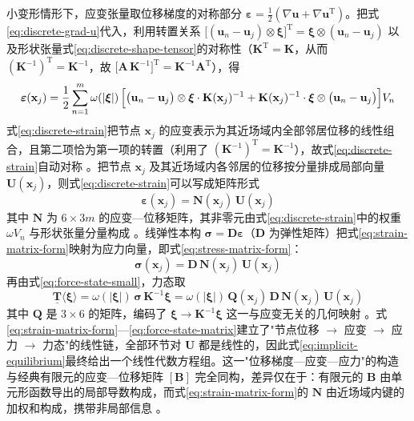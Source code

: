 小变形情形下，应变张量取位移梯度的对称部分 $\boldsymbol{\varepsilon}=\tfrac{1}{2}(\nabla\mathbf{u}+\nabla\mathbf{u}^{\mathrm{T}})$。把式\eqref{eq:discrete-grad-u}代入，利用转置关系 $\bigl[(\mathbf{u}_n-\mathbf{u}_j)\otimes\boldsymbol{\xi}\bigr]^{\mathrm{T}}=\boldsymbol{\xi}\otimes(\mathbf{u}_n-\mathbf{u}_j)$ 以及形状张量式\eqref{eq:discrete-shape-tensor}的对称性（$\mathbf{K}^{\mathrm{T}}=\mathbf{K}$，从而 $(\mathbf{K}^{-1})^{\mathrm{T}}=\mathbf{K}^{-1}$，故 $\bigl[\mathbf{A}\,\mathbf{K}^{-1}\bigr]^{\mathrm{T}}=\mathbf{K}^{-1}\mathbf{A}^{\mathrm{T}}$），得
\begin{equation}
  \boldsymbol{\varepsilon}(\mathbf{x}_j)=\frac{1}{2}\sum_{n=1}^{m}\omega(|\boldsymbol{\xi}|)\,
  \Bigl[\bigl(\mathbf{u}_n-\mathbf{u}_j\bigr)\otimes\boldsymbol{\xi}\cdot\mathbf{K}(\mathbf{x}_j)^{-1}
  +\mathbf{K}(\mathbf{x}_j)^{-1}\cdot\boldsymbol{\xi}\otimes\bigl(\mathbf{u}_n-\mathbf{u}_j\bigr)\Bigr]V_n
  \label{eq:discrete-strain}
\end{equation}
式\eqref{eq:discrete-strain}把节点 $\mathbf{x}_j$ 的应变表示为其近场域内全部邻居位移的线性组合，且第二项恰为第一项的转置（利用了 $(\mathbf{K}^{-1})^{\mathrm{T}}=\mathbf{K}^{-1}$），故式\eqref{eq:discrete-strain}自动对称 \cite{Breitenfeld2014,BreitenfeldThesis2014}。把节点 $\mathbf{x}_j$ 及其近场域内各邻居的位移按分量排成局部向量 $\mathbf{U}(\mathbf{x}_j)$，则式\eqref{eq:discrete-strain}可以写成矩阵形式
\begin{equation}
  \boldsymbol{\varepsilon}(\mathbf{x}_j)=\mathbf{N}(\mathbf{x}_j)\,\mathbf{U}(\mathbf{x}_j)
  \label{eq:strain-matrix-form}
\end{equation}
其中 $\mathbf{N}$ 为 $6\times 3m$ 的应变—位移矩阵，其非零元由式\eqref{eq:discrete-strain}中的权重 $\omega V_n$ 与形状张量分量构成 \cite{BreitenfeldThesis2014}。线弹性本构 $\boldsymbol{\sigma}=\mathbf{D}\boldsymbol{\varepsilon}$（$\mathbf{D}$ 为弹性矩阵）把式\eqref{eq:strain-matrix-form}映射为应力向量，即式\eqref{eq:stress-matrix-form}：
\begin{equation}
  \boldsymbol{\sigma}(\mathbf{x}_j)=\mathbf{D}\,\mathbf{N}(\mathbf{x}_j)\,\mathbf{U}(\mathbf{x}_j)
  \label{eq:stress-matrix-form}
\end{equation}
再由式\eqref{eq:force-state-small}，力态取
\begin{equation}
  \underline{\mathbf{T}}\langle\boldsymbol{\xi}\rangle
  =\omega(|\boldsymbol{\xi}|)\,\boldsymbol{\sigma}\,\mathbf{K}^{-1}\boldsymbol{\xi}
  =\omega(|\boldsymbol{\xi}|)\,\mathbf{Q}(\mathbf{x}_j)\,\mathbf{D}\,\mathbf{N}(\mathbf{x}_j)\,\mathbf{U}(\mathbf{x}_j)
  \label{eq:force-state-matrix}
\end{equation}
其中 $\mathbf{Q}$ 是 $3\times 6$ 的矩阵，编码了 $\boldsymbol{\xi}\to\mathbf{K}^{-1}\boldsymbol{\xi}$ 这一与应变无关的几何映射 \cite{BreitenfeldThesis2014}。式\eqref{eq:strain-matrix-form}—\eqref{eq:force-state-matrix}建立了"节点位移 $\to$ 应变 $\to$ 应力 $\to$ 力态"的线性链，全部环节对 $\mathbf{U}$ 都是线性的，因此式\eqref{eq:implicit-equilibrium}最终给出一个线性代数方程组。这一"位移梯度—应变—应力"的构造与经典有限元的应变—位移矩阵 $[\mathbf{B}]$ 完全同构，差异仅在于：有限元的 $\mathbf{B}$ 由单元形函数导出的局部导数构成，而式\eqref{eq:strain-matrix-form}的 $\mathbf{N}$ 由近场域内键的加权和构成，携带非局部信息 \cite{Breitenfeld2014,Macek2007}。


